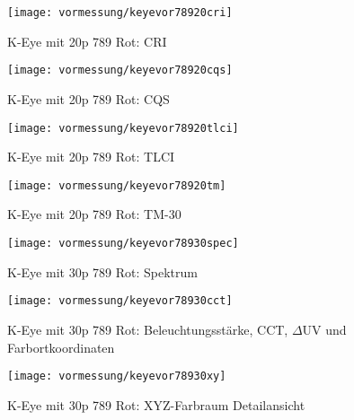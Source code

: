 \documentclass[pagesize,paper=A4,fontsize=12pt,utf8,numbers=noenddot,bibliography=totoc,listof=totoc,DIV=11,BCOR=1mm]{scrreprt}
\begin{document}
\begin{figure}[htp]     %
\centering
\texttt{[image: vormessung/keyevor78920cri]} 
\caption {K-Eye mit 20p 789 Rot: CRI} 
\end{figure}

\begin{figure}[htp]     %
\centering
\texttt{[image: vormessung/keyevor78920cqs]} 
\caption {K-Eye mit 20p 789 Rot: CQS} 
\end{figure}

\begin{figure}[htp]     %
\centering
\texttt{[image: vormessung/keyevor78920tlci]} 
\caption {K-Eye mit 20p 789 Rot: TLCI} 
\end{figure}

\begin{figure}[htp]     %
\centering
\texttt{[image: vormessung/keyevor78920tm]} 
\caption {K-Eye mit 20p 789 Rot: TM-30} 
\end{figure}



\begin{figure}[htp]     %
\centering
\texttt{[image: vormessung/keyevor78930spec]} 
\caption {K-Eye mit 30p 789 Rot: Spektrum} 
\end{figure}

\begin{figure}[htp]     %
\centering
\texttt{[image: vormessung/keyevor78930cct]} 
\caption {K-Eye mit 30p 789 Rot: Beleuchtungsstärke, CCT, $\Delta$UV und Farbortkoordinaten} 
\end{figure}

\begin{figure}[htp]     %
\centering
\texttt{[image: vormessung/keyevor78930xy]} 
\caption {K-Eye mit 30p 789 Rot: XYZ-Farbraum Detailansicht} 
\end{figure}
\end{document}

